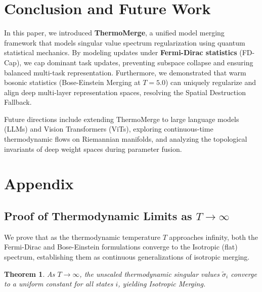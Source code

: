 \documentclass{article}
\theoremstyle{plain}
\newtheorem{theorem}{Theorem}[section]
\theoremstyle{definition}
\theoremstyle{remark}
\begin{document}
\section{Conclusion and Future Work}
\label{sec:conclusion}

In this paper, we introduced \textbf{ThermoMerge}, a unified model merging framework that models singular value spectrum regularization using quantum statistical mechanics. By modeling updates under \textbf{Fermi-Dirac statistics} (FD-Cap), we cap dominant task updates, preventing subspace collapse and ensuring balanced multi-task representation. Furthermore, we demonstrated that warm bosonic statistics (Bose-Einstein Merging at $T=5.0$) can uniquely regularize and align deep multi-layer representation spaces, resolving the Spatial Destruction Fallback.

Future directions include extending ThermoMerge to large language models (LLMs) and Vision Transformers (ViTs), exploring continuous-time thermodynamic flows on Riemannian manifolds, and analyzing the topological invariants of deep weight spaces during parameter fusion.

\newpage
\nocite{*}



\newpage
\appendix
\onecolumn
\section{Appendix}

\subsection{Proof of Thermodynamic Limits as $T \to \infty$}
We prove that as the thermodynamic temperature $T$ approaches infinity, both the Fermi-Dirac and Bose-Einstein formulations converge to the Isotropic (flat) spectrum, establishing them as continuous generalizations of isotropic merging.

\begin{theorem}
As $T \to \infty$, the unscaled thermodynamic singular values $\tilde{\sigma}_i$ converge to a uniform constant for all states $i$, yielding Isotropic Merging.
\end{theorem}
\end{document}
